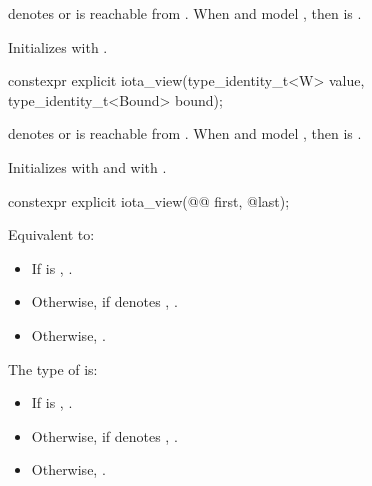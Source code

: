 \begin{itemdescr}
\pnum
\expects
{} denotes  or
 is reachable from .
When  and  model ,
then  is .

\pnum
\effects
Initializes  with .
\end{itemdescr}

%
\begin{itemdecl}
constexpr explicit iota_view(type_identity_t<W> value, type_identity_t<Bound> bound);
\end{itemdecl}

\begin{itemdescr}
\pnum
\expects
{} denotes  or
 is reachable from .
When  and  model ,
then  is .

\pnum
\effects
Initializes  with  and
 with .
\end{itemdescr}

%
\begin{itemdecl}
constexpr explicit iota_view(@@ first, @\seebelow@ last);
\end{itemdecl}

\begin{itemdescr}
\pnum
\effects
Equivalent to:
\begin{itemize}
\item
If  is ,
.
\item
Otherwise, if  denotes ,
.
\item
Otherwise, .
\end{itemize}

\pnum
\remarks
The type of  is:
\begin{itemize}
\item
If  is , .
\item
Otherwise, if  denotes ,
.
\item
Otherwise, .
\end{itemize}
\end{itemdescr}

